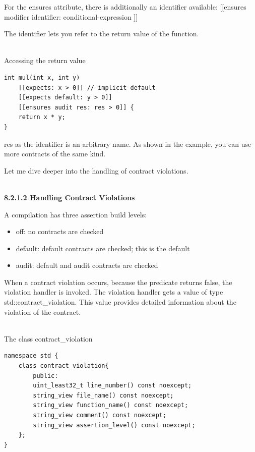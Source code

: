 For the ensures attribute, there is additionally an identifier available: [[ensures modifier identifier: conditional-expression ]] 

The identifier lets you refer to the return value of the function.

\hspace*{\fill} \\ %
\noindent
Accessing the return value
\begin{lstlisting}[style=styleCXX]
int mul(int x, int y)
	[[expects: x > 0]] // implicit default
	[[expects default: y > 0]]
	[[ensures audit res: res > 0]] {
	return x * y;
}
\end{lstlisting}

res as the identifier is an arbitrary name. As shown in the example, you can use more contracts of the same kind.

Let me dive deeper into the handling of contract violations.

\hspace*{\fill} \\ %
\noindent
\textbf{8.2.1.2\hspace{0.2cm} Handling Contract Violations}

A compilation has three assertion build levels:

\begin{itemize}
\item 
off: no contracts are checked

\item 
default: default contracts are checked; this is the default

\item 
audit: default and audit contracts are checked
\end{itemize}

When a contract violation occurs, because the predicate returns false, the violation handler is invoked. The violation handler gets a value of type std::contract\_violation. This value provides detailed information about the violation of the contract.

\hspace*{\fill} \\ %
\noindent
The class contract\_violation
\begin{lstlisting}[style=styleCXX]
namespace std {
	class contract_violation{
		public:
		uint_least32_t line_number() const noexcept;
		string_view file_name() const noexcept;
		string_view function_name() const noexcept;
		string_view comment() const noexcept;
		string_view assertion_level() const noexcept;
	};
}
\end{lstlisting}

